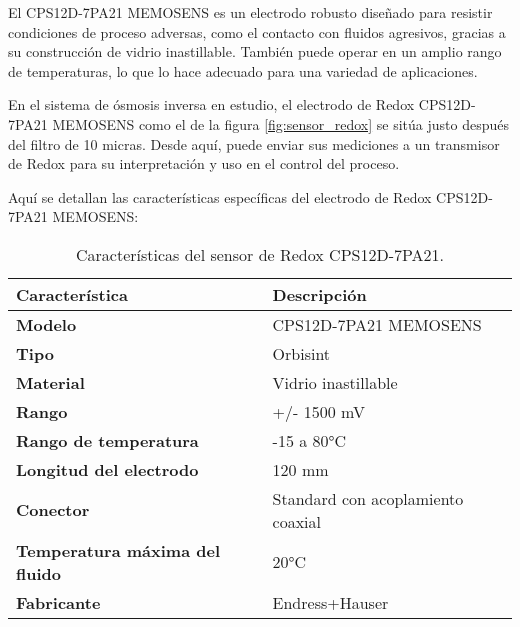 El CPS12D-7PA21 MEMOSENS es un electrodo robusto diseñado para resistir condiciones de proceso adversas, como el
contacto con fluidos agresivos, gracias a su construcción de vidrio inastillable. También puede operar en un amplio
rango de temperaturas, lo que lo hace adecuado para una variedad de aplicaciones.

En el sistema de ósmosis inversa en estudio, el electrodo de Redox CPS12D-7PA21 MEMOSENS como el de la figura \ref{fig:sensor_redox}
se sitúa justo después del filtro de 10 micras. Desde aquí, puede enviar sus mediciones a un transmisor de
Redox para su interpretación y uso en el control del proceso.



Aquí se detallan las características específicas del electrodo de Redox CPS12D-7PA21 MEMOSENS:\\

\begin{table}[H]
    \centering
    \caption{Características del sensor de Redox CPS12D-7PA21.}
    \label{table:sensor_redox}
    \begin{tabular}{| L{6cm} | L{6cm} |}
        \hline
        \textbf{Característica}                & \textbf{Descripción}              \\
        \hline
        \textbf{Modelo}                        & CPS12D-7PA21 MEMOSENS             \\
        \hline
        \textbf{Tipo}                          & Orbisint                          \\
        \hline
        \textbf{Material}                      & Vidrio inastillable               \\
        \hline
        \textbf{Rango}                         & +/- 1500 mV                       \\
        \hline
        \textbf{Rango de temperatura}          & -15 a 80°C                        \\
        \hline
        \textbf{Longitud del electrodo}        & 120 mm                            \\
        \hline
        \textbf{Conector}                      & Standard con acoplamiento coaxial \\
        \hline
        \textbf{Temperatura máxima del fluido} & 20°C                              \\
        \hline
        \textbf{Fabricante}                    & Endress+Hauser                    \\
        \hline
    \end{tabular}
\end{table}


